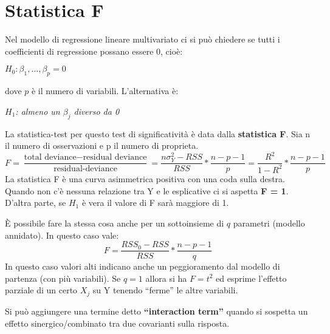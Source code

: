 \section{Statistica F}
Nel modello di regressione lineare multivariato ci si può chiedere se tutti i coefficienti di regressione possano essere 0, cioè:
\begin{center}
	$H_{0}: \beta_{1}, \dots, \beta_{p} = 0$
\end{center}
dove $p$ \`e il numero di variabili. L'alternativa \`e:
\begin{center}
	$H_{1}$\textit{: almeno un $\beta_{j}$ diverso da 0}
\end{center}
La statistica-test per questo test di significativit\`a \`e data dalla \textbf{statistica F}. Sia n il numero di osservazioni e p il numero di proprieta.
\[ F = \frac{\text{total deviance} - \text{residual deviance}}{\text{residual-deviance}} = \frac{n\sigma^2_{Y} - RSS}{RSS} * \frac{n - p - 1}{p} = \frac{R^{2}}{1 - R^{2}} * \frac{n - p - 1}{p} \]
La statistica F è una curva asimmetrica positiva con una coda sulla destra.
Quando non c'\`e nessuna relazione tra Y e le esplicative ci si aspetta \textbf{F = 1}. D'altra parte, se $H_{1}$ è vera il valore di F sar\`a maggiore di 1.

È possibile fare la stessa cosa anche per un sottoinsieme di $q$ parametri (modello annidato). In questo caso vale:
\[ F = \frac{RSS_{0} - RSS}{RSS} * \frac{n - p - 1}{q} \]
In questo caso valori alti indicano anche un peggioramento dal modello di partenza (con più variabili). Se $q = 1$ allora si ha $F=t^{2}$ ed esprime l'effetto parziale di un certo $X_{j}$ su Y tenendo ``ferme'' le altre variabili.

Si può aggiungere una termine detto \textbf{``interaction term''} quando si sospetta un effetto sinergico/combinato tra due covarianti sulla risposta.
